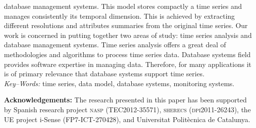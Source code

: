 \documentclass[twocolumn,11pt,a4paper]{article}
\begin{document}
{\begin{minipage}[b]{6.9in}
    database management systems. This model stores compactly a time series
    and manages consistently its temporal dimension. This is achieved by
    extracting different resolutions and attributes summaries from the
    original time series.
    Our work is concerned in putting together two areas of study: time
    series analysis and database management systems. Time series analysis
    offers a great deal of methodologies and algorithms to process time
    series data. Database systems field provides software expertise in
    managing data. Therefore, for many applications it is of primary
    relevance that database systems support time series.
    \\[4mm] \textit{Key--Words:}
    time series, data model, database systems, monitoring systems.
  \end{minipage}
  \vspace{-10pt}
}

\maketitle

\thispagestyle{empty} \pagestyle{empty}
%
%









\vspace{5pt plus 5pt} 
\noindent \textbf{Acknowledgements:} The research presented in this
paper has been supported by Spanish research project \textsc{nasp
  (TEC2012-35571)}, \textsc{sherecs (dpi2011-26243)}, the UE project
i-Sense ({\small FP7-ICT-270428}), and Universitat Polit\`{e}cnica de
Catalunya.

\printbibliography{}
\end{document}
